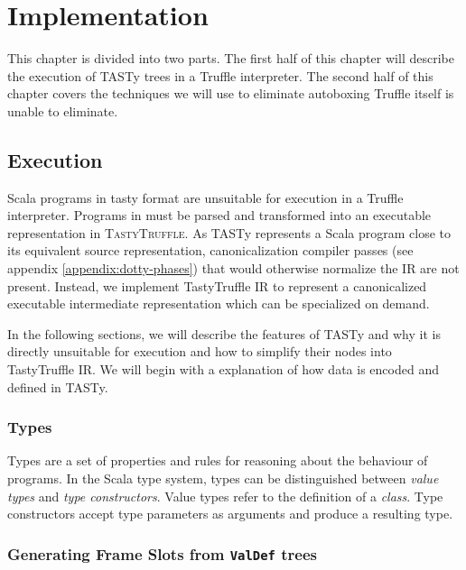 \chapter{Implementation}
\label{chapter:implementation}

This chapter is divided into two parts.
The first half of this chapter will describe the execution of TASTy trees in a Truffle interpreter.
The second half of this chapter covers the techniques we will use to eliminate autoboxing Truffle itself is unable to eliminate. 

\section{Execution}

Scala programs in \acrshort{tasty} format are unsuitable for execution in a Truffle interpreter. 
Programs in must be parsed and transformed into an executable representation in \textsc{TastyTruffle}. 
As TASTy represents a Scala program close to its equivalent source representation, canonicalization compiler passes (see appendix \ref{appendix:dotty-phases}) that would otherwise normalize the IR are not present. 
Instead, we implement TastyTruffle IR to represent a canonicalized executable intermediate representation which can be specialized on demand. 

In the following sections, we will describe the features of TASTy and why it is directly unsuitable for execution and how to simplify their nodes into TastyTruffle IR.
We will begin with a explanation of how data is encoded and defined in TASTy.

\subsection*{Types}

Types are a set of properties and rules for reasoning about the behaviour of programs. 
In the Scala type system, types can be distinguished between \textit{value types} and \textit{type constructors}. 
Value types refer to the definition of a \textit{class}. 
Type constructors accept type parameters as arguments and produce a resulting type.

\subsection{Generating Frame Slots from \texttt{ValDef} trees} 

